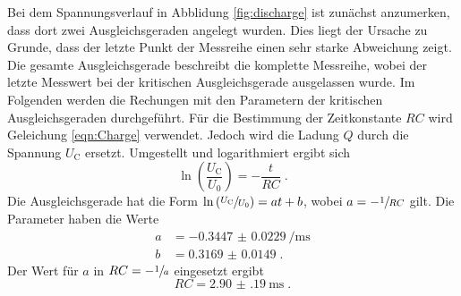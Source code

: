 \noindent Bei dem Spannungsverlauf in Abblidung \ref{fig:discharge} ist zunächst anzumerken, dass dort zwei Ausgleichsgeraden angelegt wurden. 
Dies liegt der Ursache zu Grunde, dass der letzte Punkt der Messreihe einen sehr starke Abweichung zeigt.
Die gesamte Ausgleichsgerade beschreibt die komplette Messreihe, wobei der letzte Messwert bei der kritischen Ausgleichsgerade ausgelassen wurde.
Im Folgenden werden die Rechungen mit den Parametern der kritischen Ausgleichsgeraden durchgeführt.
Für die Bestimmung der Zeitkonstante $RC$ wird Geleichung \eqref{eqn:Charge} verwendet.
Jedoch wird die Ladung $Q$ durch die Spannung $U_\text{C}$ ersetzt.
Umgestellt und logarithmiert ergibt sich 
\begin{equation}
    \ln \left( \frac{U_\text{C}}{U_0} \right ) =  - \frac{t}{RC} \; \text{.} 
\end{equation} 
Die Ausgleichsgerade hat die Form $ \ln \left( \sfrac{U_\text{C}}{U_0} \right ) = at + b$, wobei $a = - \sfrac{1}{RC}$ gilt.
Die Parameter haben die Werte 
\begin{align*}
    a &= \SI{-0.3447(229)}{\per\milli\second} \\
    b &= \num{0.3169(149)} \; \text{.}
\end{align*}
Der Wert für $a$ in $RC = - \sfrac{1}{a}$ eingesetzt ergibt
\begin{equation*}
   RC = \SI{2.90(19)}{\milli\second} \; \text{.}
\end{equation*}
